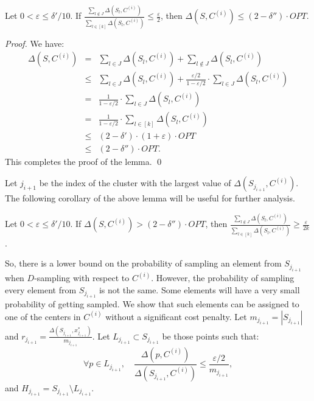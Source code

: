 \documentclass[11pt]{llncs}
\newcommand{\veps}{\varepsilon}
\begin{document}
\begin{lemma}
Let $0 < \veps \leq \delta'/10$. If $\frac{\sum_{l \notin J} \Delta(S_l, C^{(i)})}{\sum_{l \in [k]} \Delta(S_l, C^{(i)})} \leq \frac{\veps}{2}$, then $\Delta(S, C^{(i)}) \leq (2-\delta'') \cdot OPT$.
\end{lemma}
\begin{proof}
We have:
\begin{eqnarray*}
\Delta(S, C^{(i)}) &=& \sum_{l \in J} \Delta(S_l, C^{(i)}) + \sum_{l \notin J} \Delta(S_l, C^{(i)}) \\
&\leq& \sum_{l \in J} \Delta(S_l, C^{(i)}) + \frac{\veps/2}{1 - \veps/2} \cdot \sum_{l \in J} \Delta(S_l, C^{(i)})\\
&=& \frac{1}{1 - \veps/2} \cdot \sum_{l \in J} \Delta(S_l, C^{(i)}) \\
&=& \frac{1}{1 - \veps/2} \cdot \sum_{l \in [k]} \Delta(S_l, C^{(i)}) \\
&\leq& (2-\delta') \cdot (1+\veps) \cdot OPT\\
&\leq& (2 - \delta'') \cdot OPT.
\end{eqnarray*}
This completes the proof of the lemma. \qed
\end{proof}
Let $j_{i+1}$ be the index of the cluster with the largest value of $\Delta(S_{j_{i+1}}, C^{(i)})$.
The following corollary of the above lemma will be useful for further analysis.

\begin{corollary}
Let $0 < \veps \leq \delta'/10$. If $\Delta(S, C^{(i)}) > (2-\delta'') \cdot OPT$, then 
$\frac{\sum_{l \notin J} \Delta(S_l, C^{(i)})}{\sum_{l \in [k]} \Delta(S_l, C^{(i)})} \geq \frac{\veps}{2k}$.
\end{corollary}
So, there is a lower bound on the probability of sampling an element from $S_{j_{i+1}}$ when $D$-sampling with respect to $C^{(i)}$. However, the probability of sampling every element from $S_{j_{i+1}}$ is not the same. Some elements will have a very small probability of getting sampled. We show that such elements can be assigned to one of the centers in $C^{(i)}$ without a significant cost penalty. 
Let $m_{j_{i+1}} = |S_{j_{i+1}}|$ and $r_{j_{i+1}} = \frac{\Delta(S_{j_{i+1}}, x^*_{j_{i+1}})}{m_{j_{i+1}}}$.
Let $L_{j_{i+1}} \subset S_{j_{i+1}}$ be those points such that: 
$$
\forall p \in L_{j_{i+1}}, \quad \frac{\Delta(p, C^{(i)})}{\Delta(S_{j_{i+1}}, C^{(i)})} \leq \frac{\veps/2}{m_{j_{i+1}}},
$$
and $H_{j_{i+1}} = S_{j_{i+1}} \setminus L_{j_{i+1}}$. 
\end{document}
